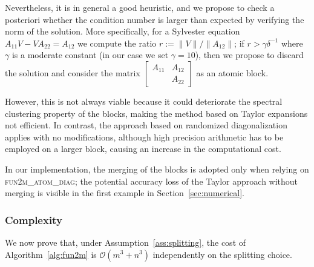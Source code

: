 \documentclass{siamart1116}
\newcommand{\norm}[1]{\lVert#1\rVert}
\begin{document}
Nevertheless, it is in general a good heuristic, and we 
propose to check a posteriori whether the condition number 
is larger than expected by verifying the norm of the solution.
More specifically, for a Sylvester equation $A_{11} V - VA_{22} = A_{12}$
we compute the ratio $r := \norm{V} / \norm{A_{12}}$; if $r > \gamma \delta^{-1}$
where $\gamma$ is a moderate constant (in our case we set $\gamma=10$), 
then we propose to
discard the solution and consider the 
matrix 
$\left[ \begin{smallmatrix} A_{11} & A_{12} \\ & A_{22} \end{smallmatrix} \right]$ as an atomic block.

However, this is not always viable because it could deteriorate the
spectral clustering property of the blocks, making the method based on 
Taylor expansions not efficient. In contrast, the approach based 
on randomized diagonalization applies with no modifications, although 
high precision arithmetic has to be employed on a larger block, causing 
an increase in the computational cost.

In our implementation, the merging of the blocks is adopted only when
relying on \textsc{fun2m\_atom\_diag}; the potential accuracy loss of 
the Taylor approach without merging is visible in the first example in 
Section~\ref{sec:numerical}.

\subsubsection{Complexity}

 We now prove that, under Assumption~\ref{ass:splitting}, the cost of Algorithm~\ref{alg:fun2m} is $\mathcal O(m^3+n^3)$ independently on the splitting choice. 
\end{document}
